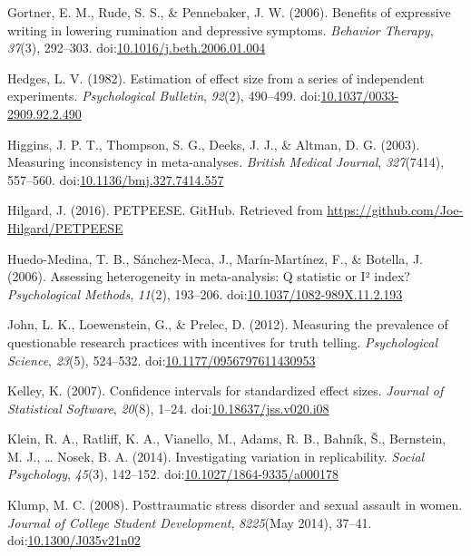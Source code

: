 \documentclass[,man]{apa6}
\begin{document}
\leavevmode\hypertarget{ref-Gortner2006}{}%
Gortner, E. M., Rude, S. S., \& Pennebaker, J. W. (2006). Benefits of expressive writing in lowering rumination and depressive symptoms. \emph{Behavior Therapy}, \emph{37}(3), 292--303. doi:\href{https://doi.org/10.1016/j.beth.2006.01.004}{10.1016/j.beth.2006.01.004}

\leavevmode\hypertarget{ref-Hedges1982}{}%
Hedges, L. V. (1982). Estimation of effect size from a series of independent experiments. \emph{Psychological Bulletin}, \emph{92}(2), 490--499. doi:\href{https://doi.org/10.1037/0033-2909.92.2.490}{10.1037/0033-2909.92.2.490}

\leavevmode\hypertarget{ref-Higgins2003}{}%
Higgins, J. P. T., Thompson, S. G., Deeks, J. J., \& Altman, D. G. (2003). Measuring inconsistency in meta-analyses. \emph{British Medical Journal}, \emph{327}(7414), 557--560. doi:\href{https://doi.org/10.1136/bmj.327.7414.557}{10.1136/bmj.327.7414.557}

\leavevmode\hypertarget{ref-Hilgard2016}{}%
Hilgard, J. (2016). PETPEESE. GitHub. Retrieved from \url{https://github.com/Joe-Hilgard/PETPEESE}

\leavevmode\hypertarget{ref-Huedo-Medina2006}{}%
Huedo-Medina, T. B., Sánchez-Meca, J., Marín-Martínez, F., \& Botella, J. (2006). Assessing heterogeneity in meta-analysis: Q statistic or I² index? \emph{Psychological Methods}, \emph{11}(2), 193--206. doi:\href{https://doi.org/10.1037/1082-989X.11.2.193}{10.1037/1082-989X.11.2.193}

\leavevmode\hypertarget{ref-John2012}{}%
John, L. K., Loewenstein, G., \& Prelec, D. (2012). Measuring the prevalence of questionable research practices with incentives for truth telling. \emph{Psychological Science}, \emph{23}(5), 524--532. doi:\href{https://doi.org/10.1177/0956797611430953}{10.1177/0956797611430953}

\leavevmode\hypertarget{ref-Kelley2007}{}%
Kelley, K. (2007). Confidence intervals for standardized effect sizes. \emph{Journal of Statistical Software}, \emph{20}(8), 1--24. doi:\href{https://doi.org/10.18637/jss.v020.i08}{10.18637/jss.v020.i08}

\leavevmode\hypertarget{ref-Klein2014a}{}%
Klein, R. A., Ratliff, K. A., Vianello, M., Adams, R. B., Bahník, Š., Bernstein, M. J., \ldots{} Nosek, B. A. (2014). Investigating variation in replicability. \emph{Social Psychology}, \emph{45}(3), 142--152. doi:\href{https://doi.org/10.1027/1864-9335/a000178}{10.1027/1864-9335/a000178}

\leavevmode\hypertarget{ref-Klump2008}{}%
Klump, M. C. (2008). Posttraumatic stress disorder and sexual assault in women. \emph{Journal of College Student Development}, \emph{8225}(May 2014), 37--41. doi:\href{https://doi.org/10.1300/J035v21n02}{10.1300/J035v21n02}
\end{document}
